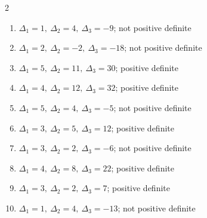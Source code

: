 \begin{multicols}{2}\raggedright
\begin{enumerate}[label=\arabic*., leftmargin=*, itemsep=1pt]
\item $\Delta_1=1,\ \Delta_2=4,\ \Delta_3=-9$; not positive definite
\item $\Delta_1=2,\ \Delta_2=-2,\ \Delta_3=-18$; not positive definite
\item $\Delta_1=5,\ \Delta_2=11,\ \Delta_3=30$; positive definite
\item $\Delta_1=4,\ \Delta_2=12,\ \Delta_3=32$; positive definite
\item $\Delta_1=5,\ \Delta_2=4,\ \Delta_3=-5$; not positive definite
\item $\Delta_1=3,\ \Delta_2=5,\ \Delta_3=12$; positive definite
\item $\Delta_1=3,\ \Delta_2=2,\ \Delta_3=-6$; not positive definite
\item $\Delta_1=4,\ \Delta_2=8,\ \Delta_3=22$; positive definite
\item $\Delta_1=3,\ \Delta_2=2,\ \Delta_3=7$; positive definite
\item $\Delta_1=1,\ \Delta_2=4,\ \Delta_3=-13$; not positive definite
\end{enumerate}
\end{multicols}
